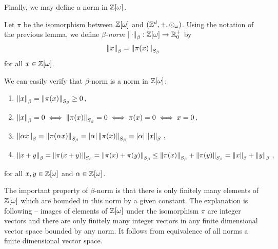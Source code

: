 Finally, we may define a norm in $\mathbb{Z}[\omega]$.
\begin{defn}
Let $\pi$ be the isomorphism between $\mathbb{Z}[\omega]$ and $(\mathbb{Z}^d,+,\odot_\omega)$. Using the notation of the previous lemma, we define \emph{$\beta$-norm}  $\left\lVert\cdot\right\rVert_{\beta}:\mathbb{Z}[\omega] \rightarrow \mathbb{R}^+_0$ by 
$$
\left\lVert x\right\rVert_{\beta}=\left\lVert\pi(x)\right\rVert_{S_\beta}
$$
for all $x\in\mathbb{Z}[\omega]$.
\end{defn}
We can easily verify that $\beta$-norm is a norm in $\mathbb{Z}[\omega]$:
\begin{enumerate}
    \item $\left\lVert x\right\rVert_{\beta}=\left\lVert\pi(x)\right\rVert_{S_\beta}\geq 0\,,$
    \item $\left\lVert x\right\rVert_{\beta}=0 \iff \left\lVert\pi(x)\right\rVert_{S_\beta}=0 \iff \pi(x)=0 \iff x=0\,,$
    \item $\left\lVert\alpha x\right\rVert_{\beta}=\left\lVert\pi(\alpha x)\right\rVert_{S_\beta}=|\alpha|\left\lVert\pi(x)\right\rVert_{S_\beta}=|\alpha|\left\lVert x\right\rVert_{\beta}\,,$
    \item $\left\lVert x+y\right\rVert_{\beta}=\left\lVert\pi(x+y)\right\rVert_{S_\beta}=\left\lVert\pi(x)+\pi(y)\right\rVert_{S_\beta}\leq \left\lVert\pi(x)\right\rVert_{S_\beta}+\left\lVert\pi(y)\right\rVert_{S_\beta}=\left\lVert x\right\rVert_{\beta}+\left\lVert y\right\rVert_{\beta}\,,$
\end{enumerate}
for all $x,y \in \mathbb{Z}[\omega]$ and $\alpha \in \mathbb{Z}[\omega]$.

The important property of $\beta$-norm is that there is only finitely many elements of $\mathbb{Z}[\omega]$ which are bounded in this norm by a given constant. The explanation is following -- images of elements of $\mathbb{Z}[\omega]$ under the isomorphism $\pi$ are integer vectors and there are only finitely many integer vectors in any finite dimensional vector space bounded by any norm. It follows from equivalence of all norms a finite dimensional vector space.

